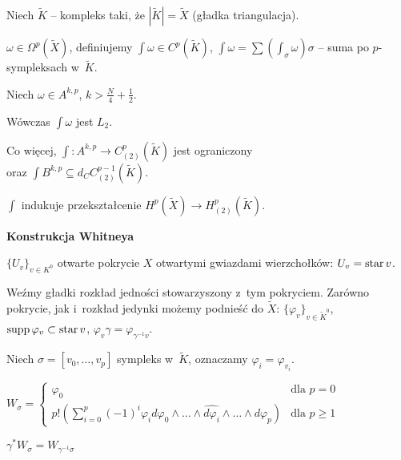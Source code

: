 Niech $\tilde{K}$ -- kompleks taki, że $| \tilde{K}| = \tilde{X}$
(gładka triangulacja).

\begin{definicja}
	$\omega \in \Omega^p(\tilde{X})$, definiujemy
	${\int \omega \in C^p(\tilde{K})}$, 
	${\int \omega = \sum (\int_\sigma \omega) \sigma}$ -- suma
	po $p$-sympleksach w~$\tilde{K}$.
\end{definicja}

\begin{lemat}
	Niech $\omega \in A^{k,p}$, $k > \frac N 4 + \frac 1 2$.
	
	Wówczas $\int \omega$ jest $L_2$.
	
	Co więcej, $\int : A^{k,p} \to C_{(2)}^p(\tilde{K})$ 
	jest ograniczony
	\\ oraz $\int B^{k,p} \subseteq d_C C_{(2)}^{p-1} (\tilde{K})$.
\end{lemat}

\begin{wniosek}
	$\int$ indukuje przekształcenie 
	${H^p(\tilde{X}) \to H_{(2)}^p(\tilde{K})}$.
\end{wniosek}
\pagebreak
{\bf Konstrukcja Whitneya}

$\{ U_v \}_{v \in K^0}$ otwarte pokrycie $X$ otwartymi gwiazdami
wierzchołków: $U_v = {\mathrm{star}}\,v$.

Weźmy gładki rozkład jedności stowarzyszony z~tym pokryciem.
Zarówno pokrycie, jak i~rozkład jedynki możemy podnieść do $\tilde{X}$:
${\{ \varphi_v \}_{v \in \tilde{K}^0}}$, 
${{\mathrm{supp}}\,\varphi_v \subset {\mathrm{star}}\, v}$,
${\varphi_v \gamma = \varphi_{\gamma^{-1} v}}$.

Niech $\sigma = [v_0, \ldots, v_p]$ sympleks w~$\tilde{K}$,
oznaczamy $\varphi_i = \varphi_{v_i}$.

\begin{definicja}
	$W_\sigma = \begin{cases}
	            	\varphi_0 & \text{dla }p=0 \\
	            	p! \left( \sum_{i=0}^p (-1)^i \varphi_i
	            	d \varphi_0 \wedge \ldots \wedge 
	            	\widehat{ d \varphi_i} \wedge \ldots
	            	\wedge d \varphi_p \right)
	            	& \text{dla }p \geq 1
	            \end{cases}$
\end{definicja}

\begin{uwaga}
	$\gamma^\ast W_\sigma = W_{\gamma^{-1} \sigma}$
\end{uwaga}

